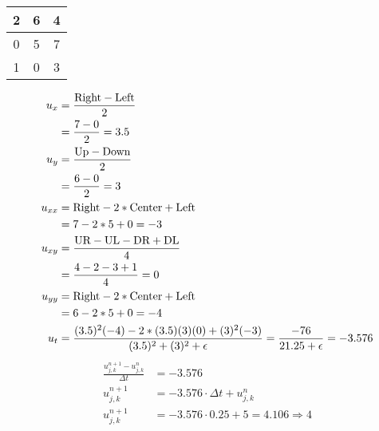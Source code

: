 \begin{center}
  \begin{tabular}{c|c|c}
    2 & 6 & 4\\
    \hline
    0 & 5 & 7\\
    \hline
    1 & 0 & 3
  \end{tabular}
\end{center}
%
\begin{align}
  u_{x}  & = \frac{\text{Right} - \text{Left}}{2}\\
   & = \frac{7 - 0}{2} = 3.5 \\
  u_{y}  & = \frac{\text{Up} - \text{Down}}{2}\\
   & = \frac{6 - 0}{2} = 3\\
  u_{xx} & = \text{Right} - 2 * \text{Center} + \text{Left}\\
   & = 7 - 2*5 + 0 = -3\\
  u_{xy} & = \frac{\text{UR} - \text{UL} - \text{DR} + \text{DL}}{4}\\
   & = \frac{4 - 2 - 3 + 1}{4} = 0\\
  u_{yy} & = \text{Right} - 2 * \text{Center} + \text{Left}\\
   & = 6 - 2*5 + 0 = -4\\
  u_t & = \frac{(3.5)^2 (-4) - 2 * (3.5)(3)(0) + (3)^2(-3)}{(3.5)^2 + (3)^2 + \epsilon} = \frac{-76}{21.25 + \epsilon} = -3.576
\end{align}
\begin{align}
  \frac{u^{n+1}_{j, k} - u^n_{j, k}}{\Delta t} & = -3.576\\
  u^{n + 1}_{j, k} & = -3.576 \cdot \Delta t + u^n_{j, k}\\
  u^{n + 1}_{j, k} & = -3.576 \cdot 0.25 + 5 = 4.106 \Rightarrow 4
\end{align}
